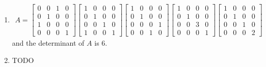 \documentclass[red]{tutorial}
\theoremstyle{definition}
\theoremstyle{theorem}
\begin{document}
\begin{solutions}
\begin{enumerate}
\begin{enumerate}
      \end{enumerate}
    \item
      \begin{align*}
        A = 
        \begin{bmatrix}
          0 & 0 & 1 & 0 \\
          0 & 1 & 0 & 0 \\
          1 & 0 & 0 & 0 \\
          0 & 0 & 0 & 1
        \end{bmatrix}
        \begin{bmatrix}
          1 & 0 & 0 & 0 \\
          0 & 1 & 0 & 0 \\
          0 & 0 & 1 & 0 \\
          1 & 0 & 0 & 1
        \end{bmatrix}
        \begin{bmatrix}
          1 & 0 & 0 & 0 \\
          0 & 1 & 0 & 0 \\
          0 & 0 & 0 & 1 \\
          0 & 0 & 1 & 0
        \end{bmatrix}
        \begin{bmatrix}
          1 & 0 & 0 & 0 \\
          0 & 1 & 0 & 0 \\
          0 & 0 & 3 & 0 \\
          0 & 0 & 0 & 1
        \end{bmatrix}
        \begin{bmatrix}
          1 & 0 & 0 & 0 \\
          0 & 1 & 0 & 0 \\
          0 & 0 & 1 & 0 \\
          0 & 0 & 0 & 2
        \end{bmatrix}
      \end{align*}
      and the determinant of $A$ is $6$.
    \item TODO
  \end{enumerate}
\end{solutions}
\end{document}
